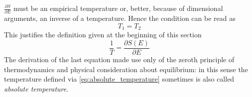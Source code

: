 $\frac{\partial S}{\partial E}$ must be an empirical temperature or, better, because of dimensional arguments, an inverse of a temperature. Hence the condition can be read as 
\begin{equation*}
    T_1 = T_2
\end{equation*}
This justifies the definition given at the beginning of this section 
\begin{equation}
    \frac{1}{T} = \frac{\partial S(E)}{\partial E}
    \label{eq:absolute_temperature}
\end{equation}
The derivation of the last equation made use only of the zeroth principle of thermodynamics and physical consideration about equilibrium: in this sense the temperature defined via \ref{eq:absolute_temperature} sometimes is also called \emph{absolute temperature}. \\

